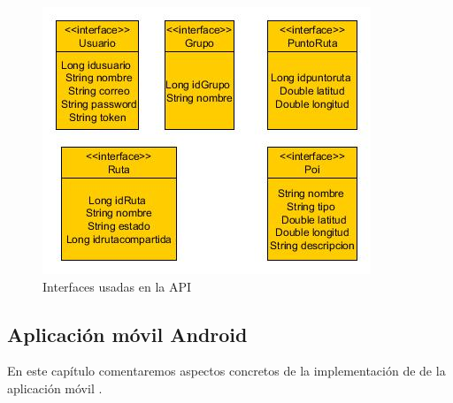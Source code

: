 \begin{figure}[H]
		\centering
		\includegraphics[width=\textwidth] {interfaz.jpg}
		\caption{Interfaces usadas en la API}
		\label{fig:interfaz}
	\end{figure}













































\newpage

 
 
 
 
 \subsection{Aplicación móvil Android}
En este capítulo comentaremos aspectos concretos de la implementación de de la aplicación móvil \cite{8}.



